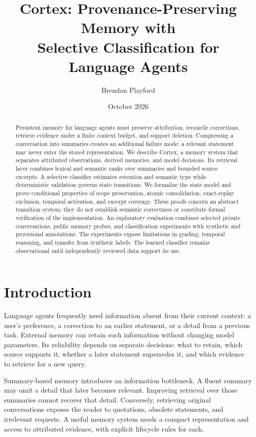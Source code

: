\documentclass[11pt]{article}
\title{Cortex: Provenance-Preserving Memory with\\Selective Classification for Language Agents}
\author{Brendan Playford}
\date{October 2026}
\begin{document}
\maketitle
\begin{abstract}
Persistent memory for language agents must preserve attribution, reconcile corrections, retrieve evidence under a finite context budget, and support deletion. Compressing a conversation into summaries creates an additional failure mode: a relevant statement may never enter the stored representation. We describe Cortex, a memory system that separates attributed observations, derived memories, and model decisions. Its retrieval layer combines lexical and semantic ranks over summaries and bounded source excerpts. A selective classifier estimates retention and semantic type while deterministic validation governs state transitions. We formalize the state model and prove conditional properties of scope preservation, atomic consolidation, exact-replay exclusion, temporal activation, and excerpt coverage. These proofs concern an abstract transition system; they do not establish semantic correctness or constitute formal verification of the implementation. An exploratory evaluation combines selected private conversations, public memory probes, and classification experiments with synthetic and provisional annotations. The experiments expose limitations in grading, temporal reasoning, and transfer from synthetic labels. The learned classifier remains observational until independently reviewed data support its use.
\end{abstract}

\section{Introduction}
Language agents frequently need information absent from their current context: a user's preference, a correction to an earlier statement, or a detail from a previous task. External memory can retain such information without changing model parameters. Its reliability depends on separate decisions: what to retain, which source supports it, whether a later statement supersedes it, and which evidence to retrieve for a new query.

Summary-based memory introduces an information bottleneck. A fluent summary may omit a detail that later becomes relevant. Improving retrieval over those summaries cannot recover that detail. Conversely, retrieving original conversations exposes the reader to quotations, obsolete statements, and irrelevant requests. A useful memory system needs a compact representation and access to attributed evidence, with explicit lifecycle rules for each.
\end{document}
